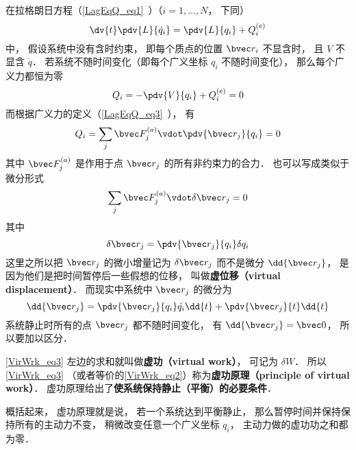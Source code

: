 
\begin{issues}
\issueTODO
\end{issues}


在拉格朗日方程（\autoref{LagEqQ_eq1}~）（$i=1,\dots,N$， 下同）
\begin{equation}\label{VirWrk_eq1}
\dv{t} \pdv{L}{\dot q_i} = \pdv{L}{q_i} + Q_i^{(e)}
\end{equation}
中， 假设系统中没有含时约束， 即每个质点的位置 $\bvec r_i$ 不显含时， 且 $V$ 不显含 $\dot q$． 若系统不随时间变化（即每个广义坐标 $q_i$ 不随时间变化）， 那么每个广义力都恒为零
\begin{equation}\label{VirWrk_eq2}
Q_i = -\pdv{V}{q_i} + Q_i^{(e)} = 0
\end{equation}
而根据广义力的定义（\autoref{LagEqQ_eq3}~）， 有
\begin{equation}
Q_i = \sum_j \bvec F_j^{(a)} \vdot \pdv{\bvec r_j}{q_i} = 0
\end{equation}
其中 $\bvec F_j^{(a)}$ 是作用于点 $\bvec r_j$ 的所有非约束力的合力． 也可以写成类似于微分形式
\begin{equation}\label{VirWrk_eq3}
\sum_j \bvec F_j^{(a)} \vdot \delta \bvec r_j = 0
\end{equation}
其中
\begin{equation}
\delta \bvec r_j = \pdv{\bvec r_j}{q_i}\delta{q_i}
\end{equation}
这里之所以把 $\bvec r_j$ 的微小增量记为 $\delta \bvec r_j$ 而不是微分 $\dd{\bvec r_j}$， 是因为他们是把时间暂停后一些假想的位移， 叫做\textbf{虚位移（virtual displacement）}． 而现实中系统中 $\bvec r_j$ 的微分为
\begin{equation}
\dd{\bvec r_j} = \pdv{\bvec r_j}{q_i}\dot{q_i}\dd{t} + \pdv{\bvec r_j}{t}\dd{t}
\end{equation}
系统静止时所有的点 $\bvec r_j$ 都不随时间变化， 有 $\dd{\bvec r_j} = \bvec 0$， 所以要加以区分．

\autoref{VirWrk_eq3} 左边的求和就叫做\textbf{虚功（virtual work）}， 可记为 $\delta W$． 所以\autoref{VirWrk_eq3} （或者等价的\autoref{VirWrk_eq2}）称为\textbf{虚功原理（principle of virtual work）}． 虚功原理给出了\textbf{使系统保持静止（平衡）的必要条件}．

概括起来， 虚功原理就是说， 若一个系统达到平衡静止， 那么暂停时间并保持保持所有的主动力不变， 稍微改变任意一个广义坐标 $q_i$， 主动力做的虚功功之和都为零．

